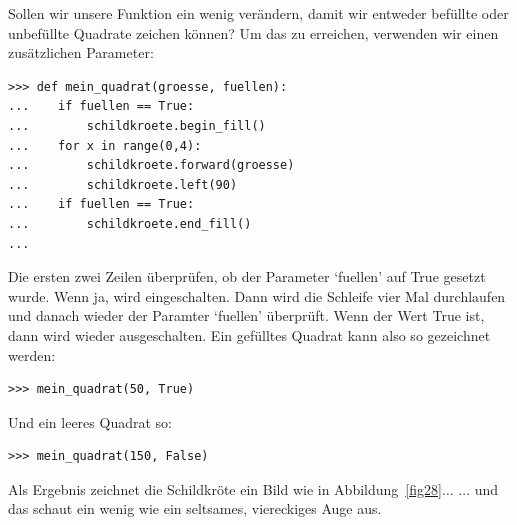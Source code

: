Sollen wir unsere Funktion ein wenig verändern, damit wir entweder befüllte oder unbefüllte Quadrate zeichen können? Um das zu erreichen, verwenden wir einen zusätzlichen Parameter:

\begin{Verbatim}[frame=single]
>>> def mein_quadrat(groesse, fuellen):
...    if fuellen == True:
...        schildkroete.begin_fill()
...    for x in range(0,4):
...        schildkroete.forward(groesse)
...        schildkroete.left(90)
...    if fuellen == True:
...        schildkroete.end_fill()
...
\end{Verbatim}

Die ersten zwei Zeilen überprüfen, ob der Parameter `fuellen' auf True gesetzt wurde. Wenn ja, wird  eingeschalten. Dann wird die Schleife vier Mal durchlaufen und danach wieder der Paramter `fuellen' überprüft. Wenn der Wert True ist, dann wird  wieder ausgeschalten. Ein gefülltes Quadrat kann also so gezeichnet werden:

\begin{Verbatim}[frame=single]
>>> mein_quadrat(50, True)
\end{Verbatim}

\noindent
Und ein leeres Quadrat so:

\begin{Verbatim}[frame=single]
>>> mein_quadrat(150, False)
\end{Verbatim}

\noindent
Als Ergebnis zeichnet die Schildkröte ein Bild wie in Abbildung~\ref{fig28}$\ldots$ $\ldots$ und das schaut ein wenig wie ein seltsames, viereckiges Auge aus.

